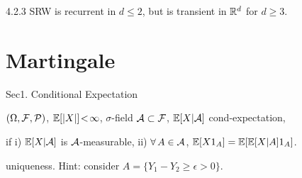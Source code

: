 \begin{thm}{4.2.3}
    SRW is recurrent in $d \leq 2$, but is transient in $\mathbb{R}^d$ for $d \geq 3$.
\end{thm}




\newcol

\section*{Martingale}

Sec1. Conditional Expectation \hrulefill

\begin{defi}
    $(\Omega, \mathcal{F}, \mathcal{P})$, $\mathbb{E}[\lvert X \rvert] \!<\! \infty$, $\sigma$-field $\mathcal{A} \subset \mathcal{F}$, $\mathbb{E}[X \vert \mathcal{A}]$ cond-expectation,
    
    if i) $\mathbb{E}[X \vert \mathcal{A}]$ is $\mathcal{A}$-measurable, ii) $\forall\, A \in \mathcal{A}$, $\mathbb{E}[X 1_{A}] = \mathbb{E}[ \mathbb{E}[X \vert A] 1_{A}]$.
    
    uniqueness. Hint: consider $A = \{Y_1 - Y_2 \geq \epsilon > 0\}$.
\end{defi}

